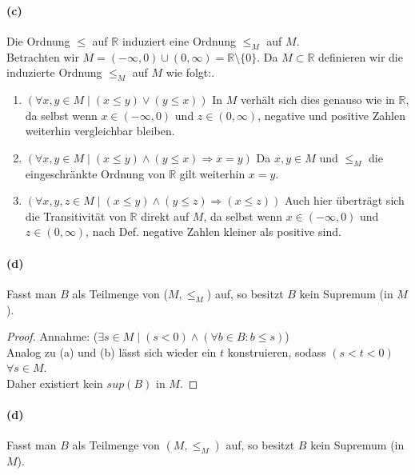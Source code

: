\documentclass[12pt, letterpaper]{article}
\begin{document}
\paragraph{(c)} Die Ordnung $\leq$ auf $\mathbb{R}$ induziert eine Ordnung $\leq_{M}$ auf $M$.\\

\noindent Betrachten wir $M = (-\infty, 0) \cup (0, \infty) = \mathbb{R} \setminus \{0\}$. Da $M \subset \mathbb{R}$ definieren wir die induzierte Ordnung $\leq_M$ auf $M$ wie folgt:.

\begin{enumerate}
    \item $(\forall x,y \in M \mid (x \leq y) \lor (y \leq x))$ In $M$ verhält sich dies genauso wie in $\mathbb{R}$, da selbst wenn $x \in (-\infty, 0)$ und $z \in (0, \infty)$, negative und positive Zahlen weiterhin vergleichbar bleiben.
    \item $(\forall x,y \in M \mid (x \leq y) \land (y \leq x) \Rightarrow x = y)$ Da $x, y \in M$ und $\leq_{M}$ die eingeschränkte Ordnung von $\mathbb{R}$ gilt weiterhin $x = y$.
    \item $(\forall x,y,z \in M \mid (x \leq y) \land (y \leq z) \Rightarrow (x \leq z))$ Auch hier überträgt sich die Transitivität von $\mathbb{R}$ direkt auf $M$, da selbst wenn $x \in (-\infty, 0)$ und $z \in (0, \infty)$, nach Def. negative Zahlen kleiner als positive sind.
\end{enumerate}

\paragraph{(d)} Fasst man $B$ als Teilmenge von ($M, \leq_{M}$) auf, so besitzt $B$ kein Supremum (in $M$).

\begin{proof}

\noindent 

\noindent Annahme: ($\exists s \in M \mid (s < 0) \land (\forall b \in B: b \leq s)$)\\

\noindent Analog zu (a) und (b) lässt sich wieder ein $t$ konstruieren, sodass $(s < t < 0)$ $\forall s \in M$. \\
\noindent Daher existiert kein $sup(B)$ in $M$.

\end{proof}


\paragraph{(d)} Fasst man $B$ als Teilmenge von $(M, \leq_M)$ auf, so besitzt $B$ kein Supremum (in $M$).
\end{document}
